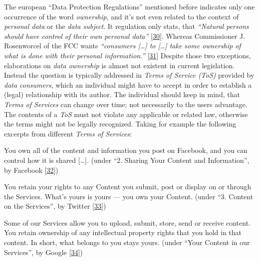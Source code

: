 \documentclass[12pt,english,a4paper,titlepage,cleardoublepage=empty,dottedtoc]{report}
\let\origquote\quote
\let\endorigquote\endquote
\renewenvironment{quote}{%
    \origquote
    \itshape
}
{\endorigquote}
\begin{document}
The european ``Data Protection Regulations'' mentioned before indicates
only one occurrence of the word \emph{ownership}, and it's not even
related to the context of \emph{personal data} or the \emph{data
subject}. It regulation only stats, that \emph{``Natural persons should
have control of their own personal data''}
{[}\protect\hyperlink{ref-regulation_2016_eu_general-data-protection-regulation_ownership}{30}{]}.
Whereas Commissioner J. Rosenworcel of the FCC wants \emph{``consumers
{[}\ldots{}{]} to {[}\ldots{}{]} take some ownership of what is done
with their personal information.''}
{[}\protect\hyperlink{ref-rules_2016_fcc_to-protect-broadband-consumer-privacy_ownership}{31}{]}
Despite those two exceptions, elaborations on \emph{data ownership} is
almost not existent in current legislation. Instead the question is
typically addressed in \emph{Terms of Service (ToS)} provided by
\emph{data consumers}, which an individual might have to accept in order
to establish a (legal) relationship with its author. The individual
should keep in mind, that \emph{Terms of Services} can change over time;
not necessarily to the users advantage. The contents of a \emph{ToS}
must not violate any applicable or related law, otherwise the terms
might not be legally recognized. Taking for example the following
excerpts from different \emph{Terms of Services}:

\begin{quote}
You own all of the content and information you post on Facebook, and you
can control how it is shared {[}\ldots{}{]}. (under ``2. Sharing Your
Content and Information'', by Facebook
{[}\protect\hyperlink{ref-web_2016_facebook_terms-of-service}{32}{]})
\end{quote}

\begin{quote}
You retain your rights to any Content you submit, post or display on or
through the Services. What's yours is yours --- you own your Content.
(under ``3. Content on the Services'', by Twitter
{[}\protect\hyperlink{ref-web_2016_twitter_terms-of-service}{33}{]})
\end{quote}

\begin{quote}
Some of our Services allow you to upload, submit, store, send or receive
content. You retain ownership of any intellectual property rights that
you hold in that content. In short, what belongs to you stays yours.
(under ``Your Content in our Services'', by Google
{[}\protect\hyperlink{ref-web_2016_google_terms-of-service}{34}{]})
\end{quote}
\end{document}
